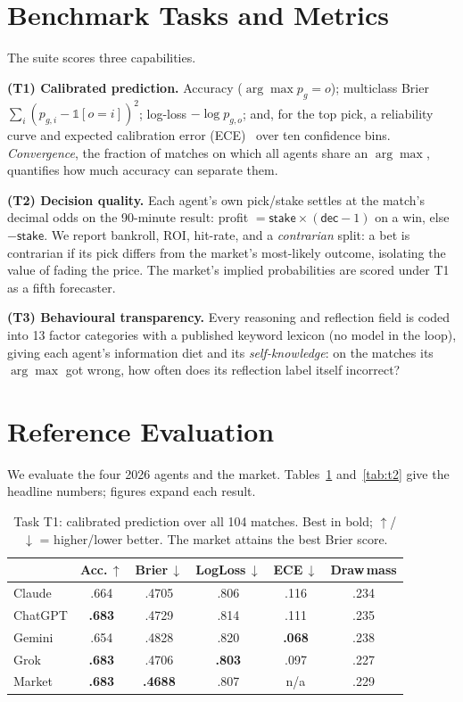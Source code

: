 \documentclass[sigconf,review]{acmart}
\begin{document}
\section{Benchmark Tasks and Metrics}
\label{sec:tasks}
The suite scores three capabilities.

\textbf{(T1) Calibrated prediction.} Accuracy ($\arg\max p_g=o$); multiclass
Brier $\sum_i(p_{g,i}-\mathbb{1}[o{=}i])^2$; log-loss $-\log p_{g,o}$; and, for
the top pick, a reliability curve and expected calibration error
(ECE)~\cite{naeini2015ece} over ten confidence bins. \emph{Convergence}, the
fraction of matches on which all agents share an $\arg\max$, quantifies
how much accuracy can separate them.

\textbf{(T2) Decision quality.} Each agent's own pick/stake settles at the
match's decimal odds on the 90-minute result: profit $=\textsf{stake}\times(\textsf{dec}-1)$
on a win, else $-\textsf{stake}$. We report bankroll, ROI, hit-rate, and a
\emph{contrarian} split: a bet is contrarian if its pick differs from the
market's most-likely outcome, isolating the value of fading the price. The
market's implied probabilities are scored under T1 as a fifth forecaster.

\textbf{(T3) Behavioural transparency.} Every \textsf{reasoning} and reflection
field is coded into 13 factor categories with a published keyword lexicon (no
model in the loop), giving each agent's information diet and its
\emph{self-knowledge}: on the matches its $\arg\max$ got wrong, how often does
its reflection label itself \textsf{incorrect}?

\section{Reference Evaluation}
\label{sec:results}
We evaluate the four 2026 agents and the market. Tables~\ref{tab:t1}
and~\ref{tab:t2} give the headline numbers; figures expand each result.

\begin{table}[t]
\caption{Task T1: calibrated prediction over all 104 matches. Best in bold;
$\uparrow$/$\downarrow$ = higher/lower better. The market attains the best
Brier score.}
\label{tab:t1}
\small
\begin{tabular}{lccccc}
\toprule
& Acc.\,$\uparrow$ & Brier\,$\downarrow$ & LogLoss\,$\downarrow$ & ECE\,$\downarrow$ & Draw\,mass \\
\midrule
Claude   & .664 & .4705 & .806 & .116 & .234 \\
ChatGPT  & \textbf{.683} & .4729 & .814 & .111 & .235 \\
Gemini   & .654 & .4828 & .820 & \textbf{.068} & .238 \\
Grok     & \textbf{.683} & .4706 & \textbf{.803} & .097 & .227 \\
\midrule
Market   & \textbf{.683} & \textbf{.4688} & .807 & n/a & .229 \\
\bottomrule
\end{tabular}
\end{table}
\end{document}
